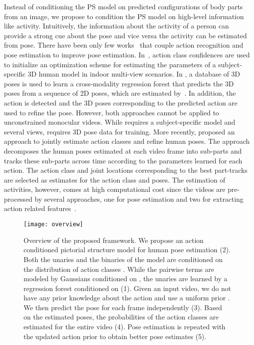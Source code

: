 \documentclass[a4paper, 10pt, conference]{ieeeconf}      \usepackage{FG2017}
\begin{document}
Instead of conditioning the PS model on predicted configurations of body parts from an image, we propose to condition the PS model on high-level information like activity.   
Intuitively, the information about the activity of a person can provide a strong cue about the pose and vice versa the activity can be estimated from pose. There have been only few works~\cite{yao_ijcv2012,Yu_cvpr2013,bruce_cvpr2015} that couple action recognition and pose estimation to improve pose estimation. In~\cite{yao_ijcv2012}, action class confidences are used to initialize an optimization scheme for estimating the parameters of a subject-specific 3D human model in indoor multi-view scenarios. In \cite{Yu_cvpr2013}, a database of 3D poses is used to learn a cross-modality regression forest that predicts the 3D poses from a sequence of 2D poses, which are estimated by~\cite{yang_tpami2014}. In addition, the action is detected and the 3D poses corresponding to the predicted action are used to refine the pose. However, both approaches cannot be applied to unconstrained monocular videos. While \cite{yao_ijcv2012} requires a subject-specific model and several views, \cite{Yu_cvpr2013} requires 3D pose data for training. More recently, \cite{bruce_cvpr2015} proposed an approach to jointly estimate action classes and refine human poses. The approach decomposes the human poses estimated at each video frame into sub-parts and tracks these sub-parts across time according to the parameters learned for each action. The action class and joint locations corresponding to the best part-tracks are selected as estimates for the action class and poses. 
The estimation of activities, however, comes at high computational cost since the videos are pre-processed by several approaches, one for pose estimation \cite{park_iccv2011} and two for extracting action related features~\cite{wang:2011,wang2014cross}. 

\begin{figure*}[t!]
\centering
\captionsetup[figure]{skip=0pt}
\texttt{[image: overview]}
\caption{Overview of the proposed framework. We propose an action conditioned pictorial structure model for human pose estimation (2). Both the unaries  and the binaries  of the model are conditioned on the distribution of action classes . While the pairwise terms are modeled by Gaussians conditioned on , the unaries are learned by a regression forest conditioned on  (1). Given an input video, we do not have any prior knowledge about the action and use a uniform prior . We then predict the pose for each frame independently (3). Based on the estimated poses, the probabilities of the action classes  are estimated for the entire video (4). Pose estimation is repeated with the updated action prior  to obtain better pose estimates (5).}
  \vspace{-4mm}
\label{fig:overview}
\end{figure*}
\end{document}
